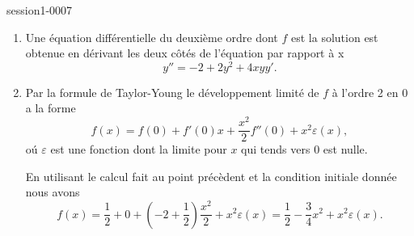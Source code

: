 
\begin{corrige}{session1-0007}

\begin{enumerate}
\item Une équation différentielle du deuxième ordre dont $f$ est la solution est obtenue en dérivant les deux c\^ot\'es de l'équation par rapport \`a x
\begin{equation*}
    y''=-2+2y^2+ 4xyy'.
\end{equation*}
\item Par la formule de Taylor-Young le développement limité de $f$ à l'ordre 2 en 0  a la forme
 \begin{equation*}
    f(x) = f(0) + f'(0) x + \frac{x^2}{2} f''(0) + x^2\varepsilon(x),
  \end{equation*}
o\'u $\varepsilon$ est une fonction dont la limite pour $x$ qui tends vers $0$ est nulle. 

En utilisant le calcul fait au point précèdent et la condition initiale donnée nous avons 
\begin{equation*}
  f(x) = \frac{1}{2 } + 0 + \left(-2 + \frac{1}{2} \right)\frac{x^2}{2} + x^2\varepsilon(x) = \frac{1}{2 } -\frac{3}{4} x^2 + x^2\varepsilon(x).
\end{equation*}
\end{enumerate}

\end{corrige}
